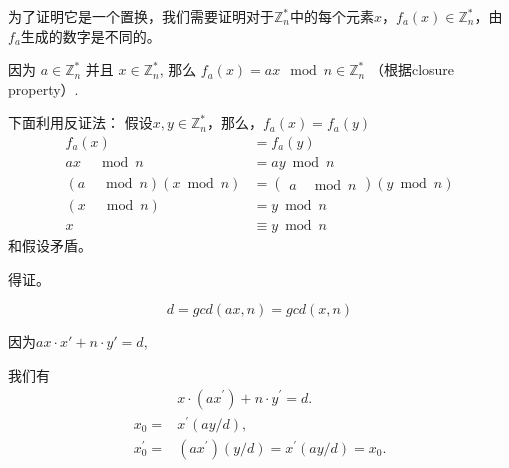\documentclass[a4paper, justified]{tufte-handout}
\begin{document}
\begin{problem}[TC 31.3-5]
\end{problem}

\begin{solution}
	为了证明它是一个置换，我们需要证明对于$\mathbb Z_n^*$中的每个元素$x$，$f_a(x) \in \mathbb Z_n^*$，由$f_a$生成的数字是不同的。

	因为 $a \in \mathbb Z_{n}^*$ 并且 $x \in \mathbb Z_n^*$, 那么 $f_a(x) = ax \mod n \in \mathbb Z_n^*$ （根据closure property）.

	下面利用反证法：
	假设$x,y \in \mathbb{Z}^*_n$，那么，$f_a(x)=f_a(y)$
	$$
		\begin{aligned}
			f_a(x)                       & =f_a(y)                              \\
			a x \quad \bmod n            & =a y \bmod n                         \\
			(a \quad \bmod n)(x \bmod n) & =\left(\begin{array}{ll}
				                                      a & \bmod n
			                                      \end{array}\right)(y \bmod n) \\
			(x \quad \bmod n)            & =y \bmod n                           \\
			x                            & \equiv y \bmod n
		\end{aligned}
	$$
	和假设矛盾。

	得证。
\end{solution}

\begin{problem}[TC 31.4-2]
\end{problem}

\begin{solution}
	$$d=gcd(ax,n)=gcd(x,n)$$

	因为$ax \cdot x' + n \cdot y' = d$,

	我们有
	$$
		\begin{aligned}
			              & x \cdot\left(a x^{\prime}\right)+n \cdot y^{\prime}=d .    \\
			x_0=          & x^{\prime}(a y / d),                                       \\
			x_0^{\prime}= & \left(a x^{\prime}\right)(y / d)=x^{\prime}(a y / d)=x_0 .
		\end{aligned}
	$$
\end{solution}
\end{document}
